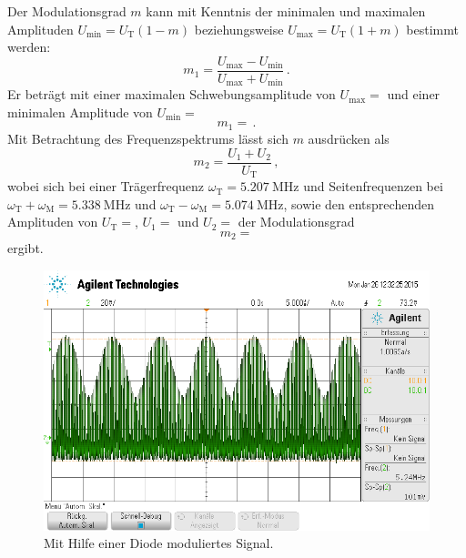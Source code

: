 Der Modulationsgrad $m$ kann mit Kenntnis der minimalen und maximalen
Amplituden $U_\text{min} = U_\text{T}(1-m)$ beziehungsweise
$U_\text{max} = U_\text{T}(1+m)$ bestimmt werden:
\begin{equation}
\label{eq:}
    m_1 = \frac{U_\text{max}-U_\text{min}}{U_\text{max}+U_\text{min}}\,.
\end{equation}
Er beträgt mit einer maximalen Schwebungsamplitude
von $U_\text{max}=$ und einer minimalen Amplitude
von $U_\text{min}=$
\begin{equation*}
    m_1 = \,.
\end{equation*}
Mit Betrachtung des Frequenzspektrums lässt sich $m$ ausdrücken als
\begin{equation}
\label{eq:}
    m_2 = \frac{U_1+U_2}{U_\text{T}}\,,
\end{equation}
wobei sich bei einer Trägerfrequenz
$\omega_\text{T} = \SI{5.207}{\mega\hertz}$ und Seitenfrequenzen bei
$\omega_\text{T} + \omega_\text{M} = \SI{5.338}{\mega\hertz}$ und
$\omega_\text{T} - \omega_\text{M} = \SI{5.074}{\mega\hertz}$, sowie den
entsprechenden Amplituden von $U_\text{T} = $,
$U_1 = $ und $U_2 = $
der Modulationsgrad
\begin{equation*}
    m_2 = 
\end{equation*}
ergibt.
\begin{figure}
    \centering
    \includegraphics[width=0.8\linewidth]{images/am-diode-signal.png}
    \caption{Mit Hilfe einer Diode moduliertes Signal.}
    \label{fig:am-diode-signal}
\end{figure}
